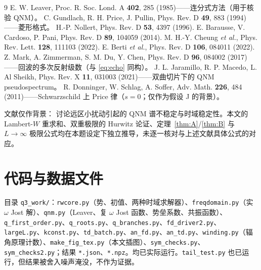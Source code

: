\documentclass[11pt,a4paper,fontset=windows]{ctexart}
\theoremstyle{definition}
\theoremstyle{definition}
\begin{document}
\begin{thebibliography}{9}\small
{} E. W. Leaver, Proc. R. Soc. Lond. A \textbf{402}, 285 (1985)——连分式方法（用于核验 QNM）。
 C. Gundlach, R. H. Price, J. Pullin, Phys. Rev. D \textbf{49}, 883 (1994)——菱形格式。
 H.-P. Nollert, Phys. Rev. D \textbf{53}, 4397 (1996).
 E. Barausse, V. Cardoso, P. Pani, Phys. Rev. D \textbf{89}, 104059 (2014).
 M. H.-Y. Cheung \emph{et al.}, Phys. Rev. Lett. \textbf{128}, 111103 (2022).
 E. Berti \emph{et al.}, Phys. Rev. D \textbf{106}, 084011 (2022).
 Z. Mark, A. Zimmerman, S. M. Du, Y. Chen, Phys. Rev. D \textbf{96}, 084002 (2017)——回波的多次反射级数（与 \eqref{eq:echo} 同构）。
 J. L. Jaramillo, R. P. Macedo, L. Al Sheikh, Phys. Rev. X \textbf{11}, 031003 (2021)——双曲切片下的 QNM pseudospectrum。
 R. Donninger, W. Schlag, A. Soffer, Adv. Math. \textbf{226}, 484 (2011)——Schwarzschild 上 Price 律（$s=0$；仅作为假设 J 的背景）。
\end{thebibliography}
\noindent\small 文献仅作背景：\cite{Nollert,BCP,Cheung,Berti} 讨论远区小扰动引起的 QNM 谱不稳定与时域稳定性。本文的 Lambert-$W$ 重求和、双重极限的 Hurwitz 论证、定理~\ref{thm:A}/\ref{thm:B} 与 $L\to\infty$ 极限公式均在本题设定下独立推导，未逐一核对与上述文献具体公式的对应。

\appendix
\section{代码与数据文件}
\small 目录 \texttt{q3\_work/}：\texttt{rwcore.py}（势、初值、两种时域求解器）、\texttt{freqdomain.py}（实 $\omega$ Jost 解）、\texttt{qnm.py}（Leaver、复 $\omega$ Jost 函数、势垒系数、共振函数）、\texttt{q\_first\_order.py}、\texttt{q\_roots.py}、\texttt{q\_branches.py}、\texttt{fd\_driver2.py}、\texttt{largeL.py}、\texttt{kconst.py}、\texttt{td\_batch.py}、\texttt{an\_fd.py}、\texttt{an\_td.py}、\texttt{winding.py}（辐角原理计数）、\texttt{make\_fig\_tex.py}（本文插图）、\texttt{sym\_checks.py}、\texttt{sym\_checks2.py}；结果 \texttt{*.json}、\texttt{*.npz}。均已实际运行。\texttt{tail\_test.py} 也已运行，但结果被舍入噪声淹没，不作为证据。
\end{document}
